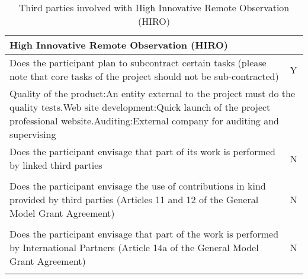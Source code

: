 \begin{table}[H]
	\centering
	\begin{tabular}{|p{10cm}|p{4cm}|}
		\hline
		
		\multicolumn{2}{|p{14cm}|}{\textbf{High Innovative Remote Observation (HIRO)}}\\
		
		\hline
		
		Does the participant plan to subcontract certain tasks (please note that core tasks of the project should not be sub-contracted) & Y\\
		
		\hline
		
		\multicolumn{2}{|p{14cm}|}{Quality of the product:\newline An entity external to the project must do the quality tests.\vspace{0.2cm}\newline Web site development:\newline Quick launch of the project professional website.\vspace{0.2cm}\newline Auditing:\newline External company for auditing and supervising}\\
		
		\hline
		
		Does the participant envisage that part of its work is performed by linked third parties & N\\
		
		\hline
		
		\multicolumn{2}{|p{14cm}|}{}\\
		
		\hline
		
		Does the participant envisage the use of contributions in kind provided by third parties (Articles 11 and 12 of the General Model Grant Agreement) & N\\
		
		\hline
		
		\multicolumn{2}{|p{14cm}|}{}\\
		
		\hline
		
		Does the participant envisage that part of the work is performed by International Partners (Article 14a of the General Model Grant Agreement) & N\\
		
		\hline
		
		\multicolumn{2}{|p{14cm}|}{}\\
		
		\hline
	\end{tabular}
	\caption{Third parties involved with High Innovative Remote Observation (HIRO)}
\end{table}



